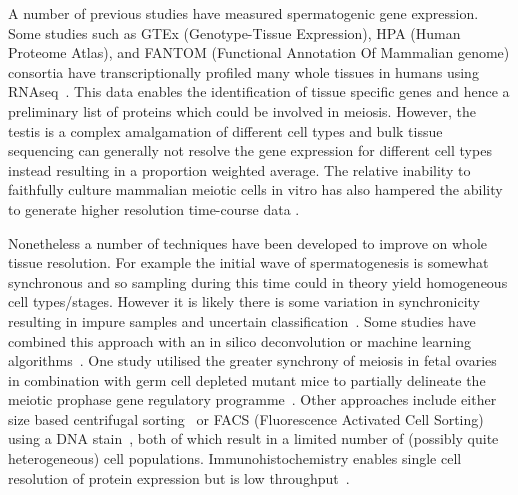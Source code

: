 A number of previous studies have measured spermatogenic gene expression. Some studies such as GTEx (Genotype-Tissue Expression), HPA (Human Proteome Atlas), and FANTOM (Functional Annotation Of Mammalian genome) consortia have transcriptionally profiled many whole tissues in humans using RNAseq~\parencite{Mele2015Human,Uhlen2015Tissuebased,Uhlen2016Transcriptomics}. This data enables the identification of tissue specific genes and hence a preliminary list of proteins which could be involved in meiosis.  However, the testis is a complex amalgamation of different cell types and bulk tissue sequencing can generally not resolve the gene expression for different cell types instead resulting in a proportion weighted average. The relative inability to faithfully culture mammalian meiotic cells in vitro has also hampered the ability to generate higher resolution time-course data \parencite{Zhou2016Complete, Hikabe2016Reconstitution}.

Nonetheless a number of techniques have been developed to improve on whole tissue resolution. For example the initial wave of spermatogenesis is somewhat synchronous and so sampling during this time could in theory yield homogeneous cell types/stages. However it is likely there is some variation in synchronicity resulting in impure samples and uncertain classification~\parencite{Laiho2013Transcriptome,Ball2016Regulatory}. Some studies have combined this approach with an in silico deconvolution or machine learning algorithms~\parencite{Margolin2014Integrated,Li2013Identification}. One study utilised the greater synchrony of meiosis in fetal ovaries in combination with germ cell depleted mutant mice to partially delineate the meiotic prophase gene regulatory programme~\parencite{Soh2015Gene}. Other approaches include either size based centrifugal sorting~\parencite{Soumillon2013Cellular,Buard2009Distinct,Grabske1975Centrifugal} or FACS (Fluorescence Activated Cell Sorting) using a DNA stain~\parencite{daCruz2016Transcriptome}, both of which result in a limited number of (possibly quite heterogeneous) cell populations. Immunohistochemistry enables single cell resolution of protein expression but is low throughput~\parencite{Djureinovic2014human}.




